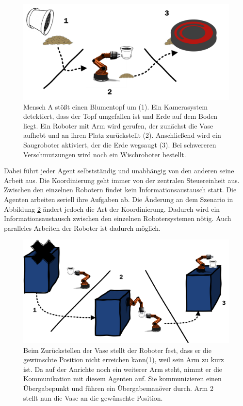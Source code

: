 \begin{figure}
	\centering
	\includegraphics[width=\textwidth]{fig/szen1}   
	\caption[Beispiel Szenario 1]{Mensch A stößt einen Blumentopf um (1). Ein Kamerasystem detektiert, dass der Topf umgefallen ist und Erde auf dem Boden liegt. Ein Roboter mit Arm wird gerufen, der zunächst die Vase aufhebt und an ihren Platz zurückstellt (2). Anschließend wird ein Saugroboter aktiviert, der die Erde wegsaugt (3). Bei schwereren Verschmutzungen wird noch ein Wischroboter bestellt.}
	\label{fig:szen1}
\end{figure}

Dabei führt jeder Agent selbstständig  und unabhängig von den anderen seine Arbeit aus. Die Koordinierung geht immer von der zentralen Steuereinheit aus. Zwischen den einzelnen Robotern findet kein Informationsaustausch statt. Die Agenten arbeiten seriell ihre Aufgaben ab. Die Änderung an dem Szenario in Abbildung \ref{fig:szen2} ändert jedoch die Art der Koordinierung. Dadurch wird ein Informationsaustausch zwischen den einzelnen Robotersystemen nötig. Auch paralleles Arbeiten der Roboter ist dadurch möglich.

\begin{figure}
	\centering
	\includegraphics[width=\textwidth]{fig/szen2}   
	\caption[Erweiterung Szenario 1]{Beim Zurückstellen der Vase stellt der Roboter fest, dass er die gewünschte Position nicht erreichen kann(1), weil sein Arm zu kurz ist. Da auf der Anrichte noch ein weiterer Arm steht, nimmt er die Kommunikation mit diesem Agenten auf. Sie kommunizieren einen Übergabepunkt und führen ein Übergabemanöver durch. Arm 2 stellt nun die Vase an die gewünschte Position.
	}
	\label{fig:szen2}
\end{figure}


